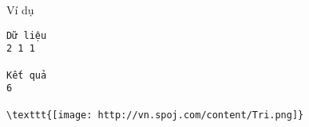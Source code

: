 Ví dụ  
\begin{verbatim}
Dữ liệu
2 1 1	

Kết quả
6 

\texttt{[image: http://vn.spoj.com/content/Tri.png]}\end{verbatim}